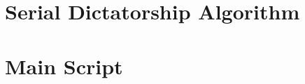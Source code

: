 \documentclass[12pt]{report}
\numberwithin{algorithm}{chapter}
\begin{document}
\section{Serial Dictatorship Algorithm}\label{sd-algorithm-code}


\section{Main Script}\label{main-script}


\clearpage
\renewcommand{\bibname}{References}


	
\end{document}
